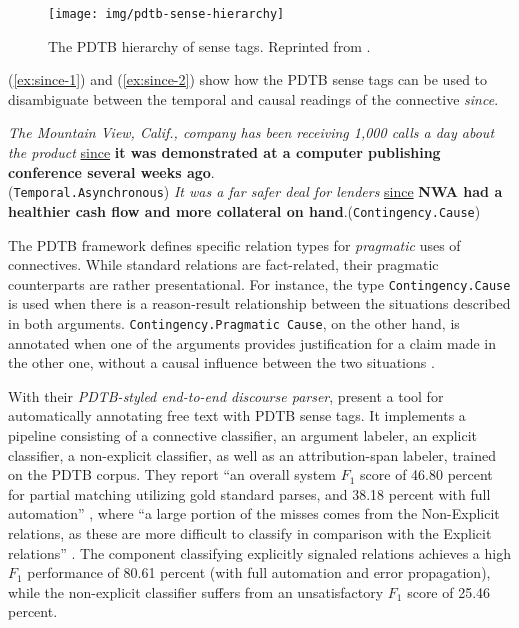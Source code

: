\documentclass[
    a4paper,%
    12pt,%
    oneside,%
    toc=bibliography,
    final,
]{scrartcl}
\begin{document}
\begin{figure}[h!]
\texttt{[image: img/pdtb-sense-hierarchy]}

\caption{The PDTB hierarchy of sense tags. Reprinted from \citet[5]{Prasad2008}.}
\label{fig:pdtb-sense-hierarchy}
\end{figure}

(\ref{ex:since-1}) and (\ref{ex:since-2}) \citep[both taken from][4]{Prasad2008} show how the PDTB sense tags can be used to disambiguate between the temporal and causal readings of the connective \textit{since}.

\begin{exe}
\ex \label{ex:since-1} \textit{The Mountain View, Calif., company has been receiving 1,000 calls a day about the product} \underline{since} \textbf{it was demonstrated at a computer publishing conference several weeks ago}.\\
\hspace*{\fill}(\lstinline|Temporal.Asynchronous|)
\ex \label{ex:since-2} \textit{It was a far safer deal for lenders} \underline{since} \textbf{NWA had a healthier cash flow and more collateral on hand}.\hspace*{\fill}(\lstinline|Contingency.Cause|)
\end{exe}

The PDTB framework defines specific relation types for \textit{pragmatic} uses of connectives. While standard relations are fact-related, their pragmatic counterparts are rather presentational. For instance, the type \lstinline|Contingency.Cause| is used when there is a reason-result relationship between the situations described in both arguments. \lstinline|Contingency.Pragmatic Cause|, on the other hand, is annotated when one of the arguments provides justification for a claim made in the other one, without a causal influence between the two situations \citep[see][29]{Prasad2007}.

\label{para:pdtb-parser}
With their \textit{PDTB-styled end-to-end discourse parser}, \citet{Lin2014} present a tool for automatically annotating free text with PDTB sense tags. It implements a pipeline consisting of a connective classifier, an argument labeler, an explicit classifier, a non-explicit classifier, as well as an attribution-span labeler, trained on the PDTB corpus. They report “an overall system $ F_1 $ score of 46.80 percent for partial matching utilizing gold standard parses, and 38.18 percent with full automation” \citep[152]{Lin2014}, where “a large portion of the misses comes from the Non-Explicit relations, as these are more difficult to classify in comparison with the Explicit relations”  \citep[177]{Lin2014}. The component classifying explicitly signaled relations achieves a high $ F_1 $ performance of 80.61 percent (with full automation and error propagation), while the non-explicit classifier suffers from an unsatisfactory $ F_1 $ score of 25.46 percent.
\end{document}
